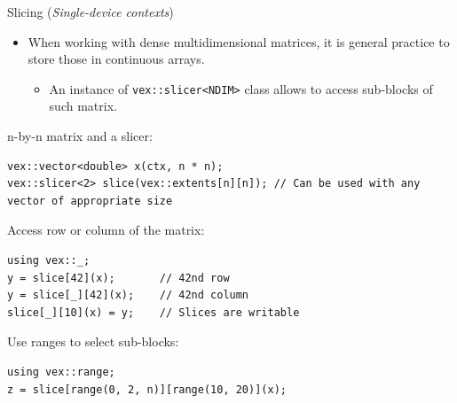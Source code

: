 \documentclass[@BEAMER_OPTIONS@]{beamer}
\newcommand{\code}[1]{\lstinline|#1|}
\newcommand{\singledevice}{\hspace{1cm}\footnotesize(\emph{Single-device contexts})}
\begin{document}
\begin{frame}[fragile]{Slicing \singledevice}
    \begin{itemize}
        \item When working with dense multidimensional matrices, it is general
            practice to store those in continuous arrays.
            \begin{itemize}
                \item An instance of \code{vex::slicer<NDIM>} class allows to
                    access sub-blocks of such matrix.
            \end{itemize}
    \end{itemize}
    \begin{exampleblock}{n-by-n matrix and a slicer:}
        \begin{lstlisting}
vex::vector<double> x(ctx, n * n);
vex::slicer<2> slice(vex::extents[n][n]); // Can be used with any vector of appropriate size
        \end{lstlisting}
    \end{exampleblock}
    \pause
    \begin{exampleblock}{Access row or column of the matrix:}
        \begin{lstlisting}[firstnumber=last]
using vex::_;
y = slice[42](x);       // 42nd row
y = slice[_][42](x);    // 42nd column
slice[_][10](x) = y;    // Slices are writable
        \end{lstlisting}
    \end{exampleblock}
    \pause
    \begin{exampleblock}{Use ranges to select sub-blocks:}
        \begin{lstlisting}[firstnumber=last]
using vex::range;
z = slice[range(0, 2, n)][range(10, 20)](x);
        \end{lstlisting}
    \end{exampleblock}
\end{frame}

\note{ }
\end{document}
